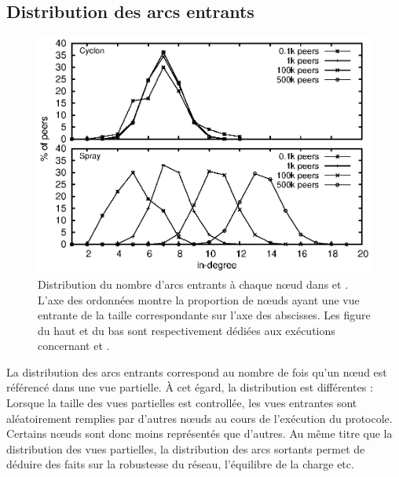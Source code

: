 \subsection{Distribution des arcs entrants}
\label{net:subsec:inview}

\begin{figure}
  \centering
  \includegraphics[width=.8\textwidth]{img/spray/histo.eps}
  \caption{\label{net:fig:inview} Distribution du nombre d'arcs entrants à
    chaque nœud dans \CYCLON et \SPRAY. L'axe des ordonnées montre la proportion
    de nœuds ayant une vue entrante de la taille correspondante sur l'axe des
    abscisses. Les figure du haut et du bas sont respectivement dédiées aux
    exécutions concernant \CYCLON et \SPRAY.}
\end{figure}

La distribution des arcs entrants correspond au nombre de fois qu'un nœud est
référencé dans une vue partielle. À cet égard, la distribution est différentes :
Lorsque la taille des vues partielles est controllée, les vues entrantes sont
aléatoirement remplies par d'autres nœuds au cours de l'exécution du
protocole. Certains nœuds sont donc moins représentés que d'autres.  Au même
titre que la distribution des vues partielles, la distribution des arcs sortants
permet de déduire des faits sur la robustesse du réseau, l'équilibre de la
charge etc. 

